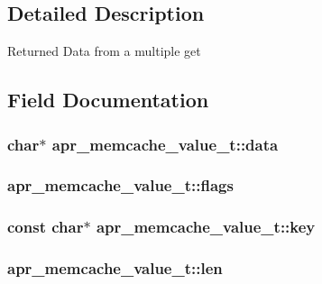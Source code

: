 \subsection{Detailed Description}
Returned Data from a multiple get 

\subsection{Field Documentation}
\subsubsection[{\texorpdfstring{data}{data}}]{\setlength{\rightskip}{0pt plus 5cm}char$\ast$ apr\+\_\+memcache\+\_\+value\+\_\+t\+::data}\hypertarget{structapr__memcache__value__t_aaa222208c2c3f010f90043802afe235d}{}\label{structapr__memcache__value__t_aaa222208c2c3f010f90043802afe235d}
\subsubsection[{\texorpdfstring{flags}{flags}}]{ apr\+\_\+memcache\+\_\+value\+\_\+t\+::flags}\hypertarget{structapr__memcache__value__t_a3314f50ec7a91e19abc44f15fdf2366f}{}\label{structapr__memcache__value__t_a3314f50ec7a91e19abc44f15fdf2366f}
\subsubsection[{\texorpdfstring{key}{key}}]{\setlength{\rightskip}{0pt plus 5cm}const char$\ast$ apr\+\_\+memcache\+\_\+value\+\_\+t\+::key}\hypertarget{structapr__memcache__value__t_a0f824723507e179cfa18a169d6efe4e4}{}\label{structapr__memcache__value__t_a0f824723507e179cfa18a169d6efe4e4}
\subsubsection[{\texorpdfstring{len}{len}}]{ apr\+\_\+memcache\+\_\+value\+\_\+t\+::len}\hypertarget{structapr__memcache__value__t_a64229f861b27fc4a9bdfab7b44c971a1}{}\label{structapr__memcache__value__t_a64229f861b27fc4a9bdfab7b44c971a1}
